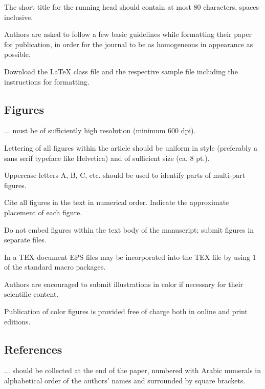\documentclass{book}
\numberwithin{equation}{section}
\begin{document}
The short title for the running head should contain at most 80 characters, spaces inclusive.

%
Authors are asked to follow a few basic guidelines while formatting their paper for publication, in order for the journal to be as homogeneous in appearance as possible.

Download the LaTeX class file and the respective sample file including the instructions for formatting.

\subsection{Figures}
$\ldots$ must be of sufficiently high resolution (minimum 600 dpi).

Lettering of all figures within the article should be uniform in style (preferably a sans serif typeface like Helvetica) and of sufficient size (ca. 8 pt.).

Uppercase letters A, B, C, etc. should be used to identify parts of multi-part figures.

Cite all figures in the text in numerical order. Indicate the approximate placement of each figure.

Do not embed figures within the text body of the manuscript; submit figures in separate files.

In a TEX document EPS files may be incorporated into the TEX file by using 1 of the standard macro packages.

%
Authors are encouraged to submit illustrations in color if necessary for their scientific content.

Publication of color figures is provided free of charge both in online and print editions.

\subsection{References}
$\ldots$ should be collected at the end of the paper, numbered with Arabic numerals in alphabetical order of the authors' names and surrounded by square brackets.
\end{document}
